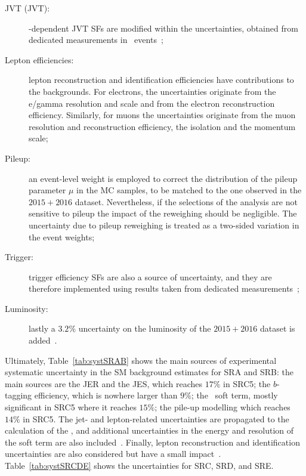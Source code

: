 \begin{description}
				\item [\acl{JVT} (JVT):] \pt-dependent \ac{JVT} \acp{SF} are modified within the uncertainties, obtained from dedicated measurements in \Zmm\ events~\cite{ATLAS-CONF-2014-018};

				\item [Lepton efficiencies:] lepton reconstruction and identification efficiencies have contributions to the backgrounds. For electrons, the uncertainties originate from the e/gamma resolution and scale and from the electron reconstruction efficiency. Similarly, for muons the uncertainties originate from the muon resolution and reconstruction efficiency, the isolation and the momentum scale;

				\item [Pileup:] an event-level weight is employed to correct the distribution of the pileup parameter $\mu$ in the \ac{MC} samples, to be matched to the one observed in the $2015+2016$ dataset. Nevertheless, if the selections of the analysis are not sensitive to pileup the impact of the reweighing should be negligible. The uncertainty due to pileup reweighing is treated as a two-sided variation in the event weights;

				\item [Trigger:] trigger efficiency \acp{SF} are also a source of uncertainty, and they are therefore implemented using results taken from dedicated measurements~\cite{ATLASTrigger2015};

				\item [Luminosity:] lastly a $3.2\%$ uncertainty on the luminosity of the $2015+2016$ dataset is added~\cite{ATLAS2013lumi}.
			\end{description}

			Ultimately, Table~\ref{tab:systSRAB} shows the main sources of experimental systematic uncertainty in the \ac{SM} background estimates for SRA and SRB: the main sources are the \ac{JER} and the \ac{JES}, which reaches $17\%$ in SRC5; the $b$-tagging efficiency, which is nowhere larger than $9\%$; the \met\ soft term, mostly significant in SRC5 where it reaches $15\%$; the pile-up modelling which reaches $14\%$ in SRC5. The jet- and lepton-related uncertainties are propagated to the calculation of the \met, and additional uncertainties in the energy and resolution of the soft term are also included~\cite{met}. Finally, lepton reconstruction and identification uncertainties are also considered but have a small impact~\cite{stop0L}. Table~\ref{tab:systSRCDE} shows the uncertainties for SRC, SRD, and SRE.

